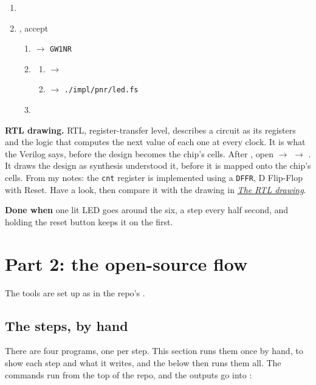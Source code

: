 \documentclass[11pt,a4paper]{article}
\begin{document}
\begin{enumerate}
     $\to$ 
  \item {}
  \item {}, accept 
  \begin{enumerate}[nosep]
    \item {} $\to$ \texttt{GW1NR}
    \item {}
    \begin{enumerate}[nosep]
      \item {} $\to$ 
      \item {} $\to$ \texttt{./impl/pnr/led.fs}
    \end{enumerate}
    \item {}
  \end{enumerate}
\end{enumerate}

\textbf{RTL drawing.} RTL, register-transfer level, describes a circuit as its registers and the logic that computes the next value of each one at every clock. It is what the Verilog says, before the design becomes the chip’s cells. After , open  $\to$  $\to$ . It draws the design as synthesis understood it, before it is mapped onto the chip’s cells. From my notes: the \texttt{cnt} register is implemented using a \texttt{DFFR}, D Flip-Flop with Reset. Have a look, then compare it with the  drawing in \hyperref[sec:rtl]{\emph{The RTL drawing}}.

\textbf{Done when} one lit LED goes around the six, a step every half second, and holding the reset button keeps it on the first.

\section*{Part 2: the open-source flow}

The tools are set up as in the repo’s .

\subsection*{The steps, by hand}

There are four programs, one per step. This section runs them once by hand, to show each step and what it writes, and the  below then runs them all. The commands run from the top of the repo, and the outputs go into :
\end{document}
